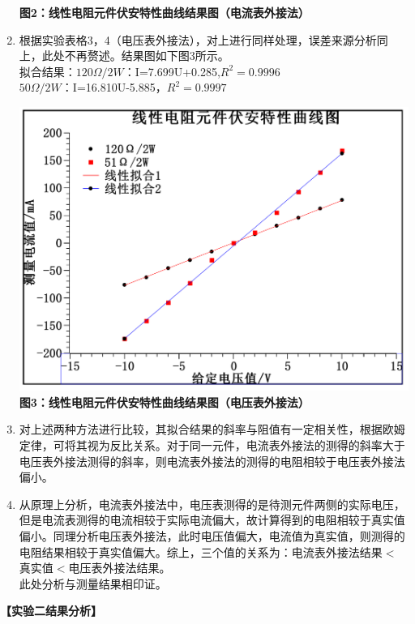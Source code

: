 \documentclass[a4paper]{article}
\begin{document}
\begin{enumerate}
\begin{center}
        \bfseries{}\songti 图2：线性电阻元件伏安特性曲线结果图（电流表外接法）
    \end{center}
    \newpage
    \item 根据实验表格3，4（电压表外接法），对上进行同样处理，误差来源分析同上，此处不再赘述。结果图如下图3所示。\\ 拟合结果：$120\Omega/2W$：I=7.699U+0.285,$R^2=0.9996$ \\ $50\Omega/2W$：I=16.810U-5.885，$R^2=0.9997$
    \begin{center}
        \includegraphics[width=\textwidth-40mm]{003}\\
        \bfseries{}\songti 图3：线性电阻元件伏安特性曲线结果图（电压表外接法）
    \end{center}
    \item 对上述两种方法进行比较，其拟合结果的斜率与阻值有一定相关性，根据欧姆定律，可将其视为反比关系。对于同一元件，电流表外接法的测得的斜率大于电压表外接法测得的斜率，则电流表外接法的测得的电阻相较于电压表外接法偏小。
    \item 从原理上分析，电流表外接法中，电压表测得的是待测元件两侧的实际电压，但是电流表测得的电流相较于实际电流偏大，故计算得到的电阻相较于真实值偏小。同理分析电压表外接法，此时电压值偏大，电流值为真实值，则测得的电阻结果相较于真实值偏大。综上，三个值的关系为：电流表外接法结果$<$真实值$<$电压表外接法结果。\\此处分析与测量结果相印证。
\end{enumerate}
\newpage
\begin{flushleft}
    \bfseries{}\songti 【实验二结果分析】
\end{flushleft}
\end{document}
